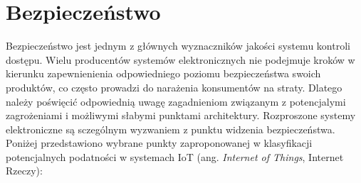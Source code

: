 	\section{Bezpieczeństwo}

		Bezpieczeństwo jest jednym z głównych wyznaczników jakości systemu kontroli dostępu. Wielu producentów systemów elektronicznych nie podejmuje kroków w kierunku zapewnienienia odpowiedniego poziomu bezpieczeństwa swoich produktów, co często prowadzi do narażenia konsumentów na straty. Dlatego należy poświęcić odpowiednią uwagę zagadnieniom związanym z potencjalymi zagrożeniami i możliwymi słabymi punktami architektury. Rozproszone systemy elektroniczne są sczególnym wyzwaniem z punktu widzenia bezpieczeństwa. Poniżej przedstawiono wybrane punkty zaproponowanej w \cite{iot-vulnerabilities} klasyfikacji potencjalnych podatności w systemach IoT (ang. \textit{Internet of Things}, Internet Rzeczy):
		
